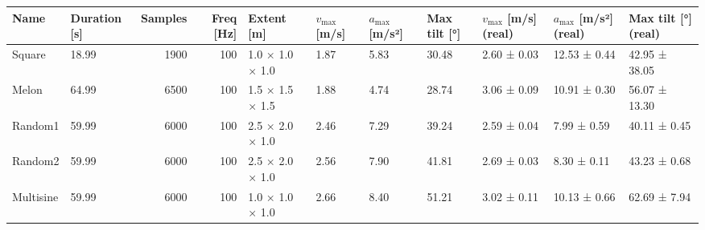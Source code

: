 \begin{tabular}{llrrlllllll}
\toprule
Name & Duration [s] & Samples & Freq [Hz] & Extent [m] & $v_{\mathrm{max}}$ [m/s] & $a_{\mathrm{max}}$ [m/s²] & Max tilt [°] & $v_{\mathrm{max}}$ [m/s] (real) & $a_{\mathrm{max}}$ [m/s²] (real) & Max tilt [°] (real) \\
\midrule
Square & 18.99 & 1900 & 100 & 1.0 × 1.0 × 1.0 & 1.87 & 5.83 & 30.48 & 2.60 ± 0.03 & 12.53 ± 0.44 & 42.95 ± 38.05 \\
Melon & 64.99 & 6500 & 100 & 1.5 × 1.5 × 1.5 & 1.88 & 4.74 & 28.74 & 3.06 ± 0.09 & 10.91 ± 0.30 & 56.07 ± 13.30 \\
Random1 & 59.99 & 6000 & 100 & 2.5 × 2.0 × 1.0 & 2.46 & 7.29 & 39.24 & 2.59 ± 0.04 & 7.99 ± 0.59 & 40.11 ± 0.45 \\
Random2 & 59.99 & 6000 & 100 & 2.5 × 2.0 × 1.0 & 2.56 & 7.90 & 41.81 & 2.69 ± 0.03 & 8.30 ± 0.11 & 43.23 ± 0.68 \\
Multisine & 59.99 & 6000 & 100 & 1.0 × 1.0 × 1.0 & 2.66 & 8.40 & 51.21 & 3.02 ± 0.11 & 10.13 ± 0.66 & 62.69 ± 7.94 \\
\bottomrule
\end{tabular}
